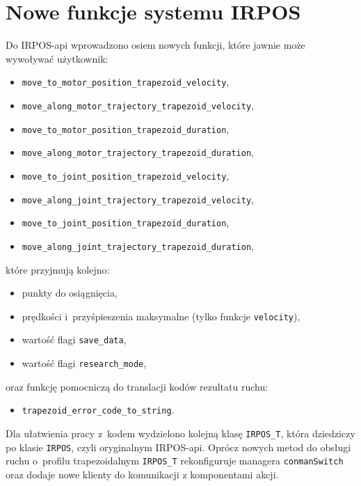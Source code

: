 \documentclass[a4paper, 12pt]{article}
\begin{document}
	\section{Nowe funkcje systemu IRPOS}
	\label{sec:api}
	Do IRPOS-api wprowadzono osiem nowych funkcji, które jawnie może wywoływać użytkownik:
	\begin{itemize}
	\item \texttt{move\_to\_motor\_position\_trapezoid\_velocity},
	\item \texttt{move\_along\_motor\_trajectory\_trapezoid\_velocity},
	\item \texttt{move\_to\_motor\_position\_trapezoid\_duration},
	\item \texttt{move\_along\_motor\_trajectory\_trapezoid\_duration},
	\item \texttt{move\_to\_joint\_position\_trapezoid\_velocity},
	\item \texttt{move\_along\_joint\_trajectory\_trapezoid\_velocity},
	\item \texttt{move\_to\_joint\_position\_trapezoid\_duration},
	\item \texttt{move\_along\_joint\_trajectory\_trapezoid\_duration},
	\end{itemize}
	które przyjmują kolejno:
	\begin{itemize}
	\item punkty do osiągnięcia,
	\item prędkości i~przyśpieszenia maksymalne (tylko funkcje \texttt{velocity}),
	\item wartość flagi \texttt{save\_data},
	\item wartość flagi \texttt{research\_mode},
	\end{itemize}
	oraz funkcję pomocniczą do translacji kodów rezultatu ruchu:
	\begin{itemize}
	\item \texttt{trapezoid\_error\_code\_to\_string}.
	\end{itemize}
	
	Dla ułatwienia pracy z~kodem wydzielono kolejną klasę \texttt{IRPOS\_T}, która dziedziczy po klasie \texttt{IRPOS}, czyli oryginalnym IRPOS-api. Oprócz nowych metod do obsługi ruchu o~profilu trapezoidalnym \texttt{IRPOS\_T} rekonfiguruje managera \texttt{conmanSwitch} oraz dodaje nowe klienty do komunikacji z komponentami akcji.
	
\end{document}
